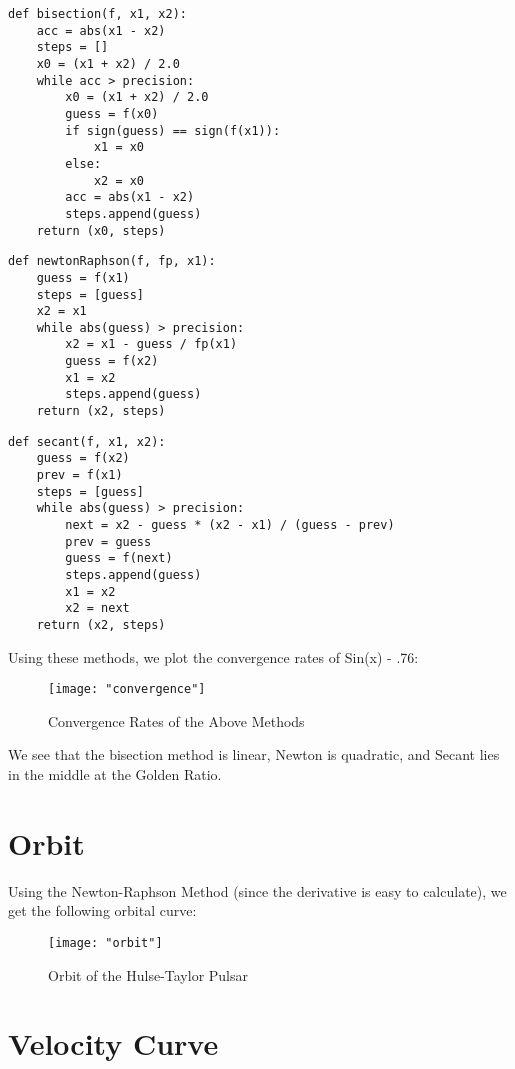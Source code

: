\documentclass{article}
\begin{document}
\begin{verbatim}
def bisection(f, x1, x2):
    acc = abs(x1 - x2)
    steps = []
    x0 = (x1 + x2) / 2.0
    while acc > precision:
        x0 = (x1 + x2) / 2.0
        guess = f(x0)
        if sign(guess) == sign(f(x1)):
            x1 = x0
        else:
            x2 = x0
        acc = abs(x1 - x2)
        steps.append(guess)
    return (x0, steps)
\end{verbatim}

\begin{verbatim}
def newtonRaphson(f, fp, x1):
    guess = f(x1)
    steps = [guess]
    x2 = x1
    while abs(guess) > precision:
        x2 = x1 - guess / fp(x1)
        guess = f(x2)
        x1 = x2
        steps.append(guess)
    return (x2, steps)
\end{verbatim}

\begin{verbatim}
def secant(f, x1, x2):
    guess = f(x2)
    prev = f(x1)
    steps = [guess]
    while abs(guess) > precision:
        next = x2 - guess * (x2 - x1) / (guess - prev)
        prev = guess
        guess = f(next)
        steps.append(guess)
        x1 = x2
        x2 = next
    return (x2, steps)
\end{verbatim}

Using these methods, we plot the convergence rates of Sin(x) - .76:

\begin{figure}[h!]
	\centering
	\texttt{[image: "convergence"]}
	\caption{Convergence Rates of the Above Methods}
\end{figure} 
\FloatBarrier

We see that the bisection method is linear, Newton is quadratic, and Secant lies in the middle at the Golden Ratio.

\section{Orbit}

Using the Newton-Raphson Method (since the derivative is easy to calculate), we get the following orbital curve:

\begin{figure}[h!]
	\centering
	\texttt{[image: "orbit"]}
	\caption{Orbit of the Hulse-Taylor Pulsar}
\end{figure} 
\FloatBarrier

\section{Velocity Curve}
\end{document}
